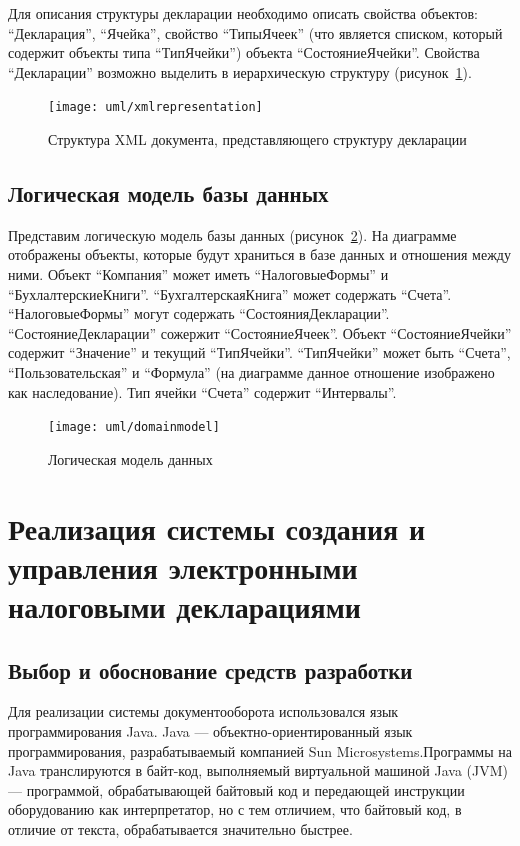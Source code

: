 \documentclass[14pt,a4paper]{reportmod}
\begin{document}
Для описания структуры декларации необходимо описать свойства объектов: ``Декларация'', ``Ячейка'', свойство ``ТипыЯчеек'' (что является списком, который содержит объекты типа ``ТипЯчейки'') объекта ``СостояниеЯчейки''. Свойства ``Декларации'' возможно выделить в иерархическую структуру (рисунок~\ref{pic:xmlrepresentation}).

\begin{figure}
  \centering
  \texttt{[image: uml/xmlrepresentation]}
  \caption{Структура XML документа, представляющего структуру декларации}
  \label{pic:xmlrepresentation}
\end{figure}

\section{Логическая модель базы данных}
Представим логическую модель базы данных (рисунок~\ref{pic:domain_model}). На диаграмме отображены объекты, которые будут храниться в базе данных и отношения между ними. Объект ``Компания'' может иметь ``НалоговыеФормы'' и ``БухлалтерскиеКниги''. ``БухгалтерскаяКнига'' может содержать ``Счета''. ``НалоговыеФормы'' могут содержать ``СостоянияДекларации''. ``СостояниеДекларации'' сожержит ``СостояниеЯчеек''. Объект ``СостояниеЯчейки'' содержит ``Значение'' и текущий ``ТипЯчейки''. ``ТипЯчейки'' может быть ``Счета'', ``Пользовательская'' и ``Формула'' (на диаграмме данное отношение изображено как наследование). Тип ячейки ``Счета'' содержит ``Интервалы''.

\begin{figure}
  \centering
  \texttt{[image: uml/domainmodel]}
  \caption{Логическая модель данных}
  \label{pic:domain_model}
\end{figure}

\chapter{Реализация системы создания и управления электронными налоговыми декларациями}

\section{Выбор и обоснование средств разработки}
Для реализации системы документооборота использовался язык программирования Java. Java --- объектно-ориентированный язык программирования, разрабатываемый компанией Sun Microsystems.Программы на Java транслируются в байт-код, выполняемый виртуальной машиной Java (JVM) --- программой, обрабатывающей байтовый код и передающей инструкции оборудованию как интерпретатор, но с тем отличием, что байтовый код, в отличие от текста, обрабатывается значительно быстрее.
\end{document}
